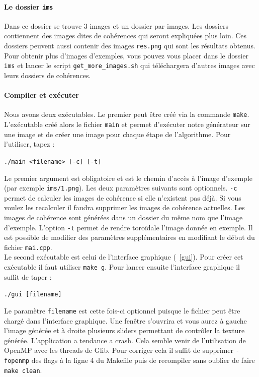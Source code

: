 \documentclass[12pt]{article}
\begin{document}
\paragraph{Le dossier \texttt{ims}}
Dans ce dossier se trouve 3 images et un dossier par images. Les dossiers contiennent des images dites de cohérences qui seront expliquées plus loin. Ces dossiers peuvent aussi contenir des images \verb|res.png| qui sont les résultats obtenus. Pour obtenir plus d'images d'exemples, vous pouvez vous placer dans le dossier \verb|ims| et lancer le script \verb|get_more_images.sh| qui téléchargera d'autres images avec leurs dossiers de cohérences.

\paragraph{Compiler et exécuter}
Nous avons deux exécutables. Le premier peut être créé via la commande \verb|make|. L'exécutable créé alors le fichier \verb|main| et permet d'exécuter notre générateur sur une image et de créer une image pour chaque étape de l'algorithme. Pour l'utiliser, tapez :
\begin{center}
	\texttt{./main <filename> [-c] [-t]}
\end{center}
Le premier argument est obligatoire et est le chemin d'accès à l'image d'exemple (par exemple \verb|ims/1.png|). Les deux paramètres suivants sont optionnels. \verb|-c| permet de calculer les images de cohérence si elle n'existent pas déjà. Si vous voulez les recalculer il faudra supprimer les images de cohérence actuelles. Les images de cohérence sont générées dans un dossier du même nom que l'image d'exemple. L'option \verb|-t| permet de rendre toroïdale l'image donnée en exemple. Il est possible de modifier des paramètres supplémentaires en modifiant le début du fichier \verb|mai.cpp|. \\
Le second exécutable est celui de l'interface graphique (\figurename~\ref{gui}). Pour créer cet exécutable il faut utiliser \verb|make g|. Pour lancer ensuite l'interface graphique il suffit de taper :
\begin{center}
	\verb|./gui [filename]|
\end{center}
Le paramètre \verb|filename| est cette fois-ci optionnel puisque le fichier peut être chargé dans l'interface graphique. Une fenêtre s'ouvrira et vous aurez à gauche l'image générée et à droite plusieurs sliders permettant de contrôler la texture générée. L'application a tendance a crash. Cela semble venir de l'utilisation de OpenMP avec les threads de Glib. Pour corriger cela il suffit de supprimer \verb|-fopenmp| des flags à la ligne 4 du Makefile puis de recompiler sans oublier de faire \verb|make clean|.
\end{document}
